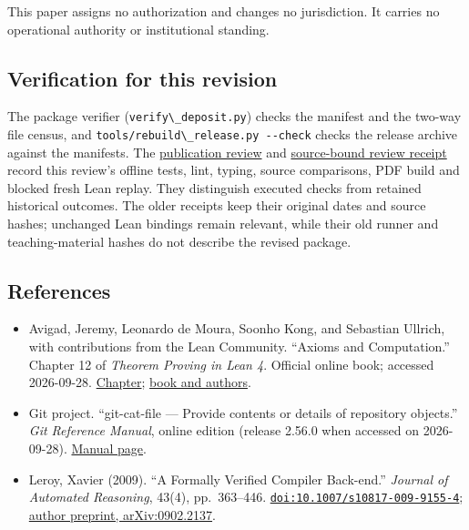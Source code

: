 \documentclass[
  11pt,
]{article}
\newcommand{\passthrough}[1]{#1}
\providecommand{\tightlist}{%
  \setlength{\itemsep}{0pt}\setlength{\parskip}{0pt}}
\begin{document}
This paper assigns no authorization and changes no jurisdiction. It
carries no operational authority or institutional standing.

\hypertarget{verification-for-this-revision}{%
\subsection{Verification for this
revision}\label{verification-for-this-revision}}

The package verifier (\passthrough{\lstinline!verify\_deposit.py!})
checks the manifest and the two-way file census, and
\passthrough{\lstinline!tools/rebuild\_release.py --check!} checks the
release archive against the manifests. The
\href{https://github.com/dbccpage/the_symbol_game/blob/main/education/documentation/030_pfp_proposal_fidelity_protocol_pfp/papers/symbol_game/008_pfp_mssn_tower_challenges_and_retraction_benchmarks/docs/publication_review_2026_10_02.md}{publication
review} and
\href{https://github.com/dbccpage/the_symbol_game/blob/main/education/documentation/030_pfp_proposal_fidelity_protocol_pfp/papers/symbol_game/008_pfp_mssn_tower_challenges_and_retraction_benchmarks/docs/review_validation_2026_10_02.json}{source-bound
review receipt} record this review's offline tests, lint, typing, source
comparisons, PDF build and blocked fresh Lean replay. They distinguish
executed checks from retained historical outcomes. The older receipts
keep their original dates and source hashes; unchanged Lean bindings
remain relevant, while their old runner and teaching-material hashes do
not describe the revised package.

\hypertarget{references}{%
\subsection{References}\label{references}}

\begin{itemize}
\tightlist
\item
  Avigad, Jeremy, Leonardo de Moura, Soonho Kong, and Sebastian Ullrich,
  with contributions from the Lean Community. ``Axioms and
  Computation.'' Chapter 12 of \emph{Theorem Proving in Lean 4}.
  Official online book; accessed 2026-09-28.
  \href{https://lean-lang.org/theorem_proving_in_lean4/Axioms-and-Computation/}{Chapter};
  \href{https://lean-lang.org/theorem_proving_in_lean4/}{book and
  authors}.
\item
  Git project. ``git-cat-file --- Provide contents or details of
  repository objects.'' \emph{Git Reference Manual}, online edition
  (release 2.56.0 when accessed on 2026-09-28).
  \href{https://git-scm.com/docs/git-cat-file}{Manual page}.
\item
  Leroy, Xavier (2009). ``A Formally Verified Compiler Back-end.''
  \emph{Journal of Automated Reasoning}, 43(4), pp.~363--446.
  \href{https://doi.org/10.1007/s10817-009-9155-4}{\nolinkurl{doi:10.1007/s10817-009-9155-4}};
  \href{https://arxiv.org/abs/0902.2137}{author preprint,
  arXiv:0902.2137}.
\end{itemize}
\end{document}
